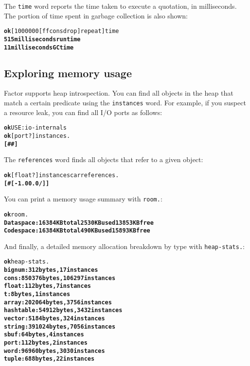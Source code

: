 \documentclass{book}
\begin{document}
The \texttt{time} word reports the time taken to execute a quotation, in milliseconds. The portion of time spent in garbage collection is also shown:

\begin{alltt}
\textbf{ok} [ 1000000 [ f f cons drop ] repeat ] time
\textbf{515 milliseconds run time
11 milliseconds GC time}
\end{alltt}

\subsection{Exploring memory usage}

Factor supports heap introspection. You can find all objects in the heap that match a certain predicate using the \texttt{instances} word. For example, if you suspect a resource leak, you can find all I/O ports as follows:

\begin{alltt}
\textbf{ok} USE: io-internals
\textbf{ok} [ port? ] instances .
\textbf{[ \#<port @ 805466443> \#<port @ 805466499> ]}
\end{alltt}

The \texttt{references} word finds all objects that refer to a given object:

\begin{alltt}
\textbf{ok} [ float? ] instances car references .
\textbf{[ \#<array @ 805542171> [ -1.0 0.0 / ] ]}
\end{alltt}

You can print a memory usage summary with \texttt{room.}:

\begin{alltt}
\textbf{ok} room.
\textbf{Data space: 16384 KB total 2530 KB used 13853 KB free
Code space: 16384 KB total 490 KB used 15893 KB free}
\end{alltt}

And finally, a detailed memory allocation breakdown by type with \texttt{heap-stats.}:

\begin{alltt}
\textbf{ok} heap-stats.
\textbf{bignum: 312 bytes, 17 instances
cons: 850376 bytes, 106297 instances
float: 112 bytes, 7 instances
t: 8 bytes, 1 instances
array: 202064 bytes, 3756 instances
hashtable: 54912 bytes, 3432 instances
vector: 5184 bytes, 324 instances
string: 391024 bytes, 7056 instances
sbuf: 64 bytes, 4 instances
port: 112 bytes, 2 instances
word: 96960 bytes, 3030 instances
tuple: 688 bytes, 22 instances}
\end{alltt}
\end{document}
